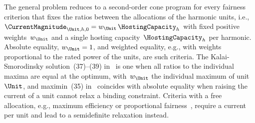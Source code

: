 The general problem reduces to a second-order cone program for every fairness criterion that fixes the ratios between the allocations of the harmonic units, i.e., $\CurrentMagnitude_{\Unit,\Harmonic,0} = w_{\Unit}\,\HostingCapacity_{\Harmonic}$ with fixed positive weights~$w_{\Unit}$ and a single hosting capacity~$\HostingCapacity_{\Harmonic}$ per harmonic. Absolute equality, $w_{\Unit} = 1$, and weighted equality, e.g., with weights proportional to the rated power of the units, are such criteria. The Kalai-Smorodinsky solution~(37)--(39) in~\cite{vanacker_hosting_2026} is one when all ratios to the individual maxima are equal at the optimum, with~$w_{\Unit}$ the individual maximum of unit~$\Unit$, and maximin~(35) in~\cite{vanacker_hosting_2026} coincides with absolute equality when raising the current of a unit cannot relax a binding constraint. Criteria with a free allocation, e.g., maximum efficiency or proportional fairness~\cite{chen_guide_2023}, require a current per unit and lead to a semidefinite relaxation instead.

